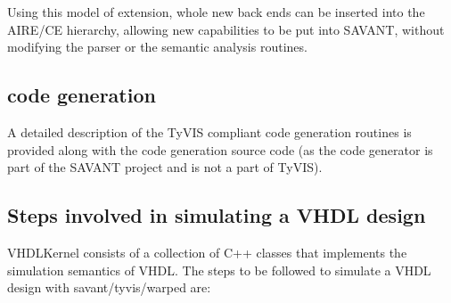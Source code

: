 \documentclass[11pt]{article}
\begin{document}
Using this model of extension, whole new back ends can be inserted into the
AIRE/CE hierarchy, allowing new capabilities to be put into SAVANT, without
modifying the parser or the semantic analysis routines.

\subsection{\Cpp\/ code generation}
A detailed description of the TyVIS compliant \Cpp\/ code generation
routines is provided along with the code generation source code (as
the code generator is part of the SAVANT project and is not a part of
TyVIS).

\subsection{Steps involved in simulating a VHDL design}
VHDLKernel consists of a collection of C++ classes that implements the
simulation semantics of VHDL. The steps to be followed to simulate a VHDL
design with savant/tyvis/warped are:
\end{document}
